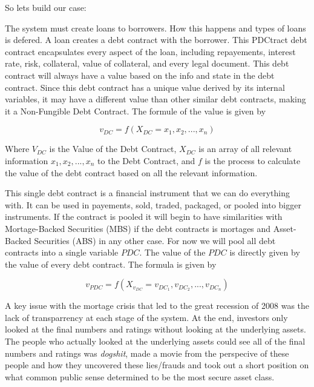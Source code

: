 So lets build our case:

The system must create loans to borrowers. How this happens and types of loans is defered. A loan creates a debt contract with the borrower. This PDCtract debt contract encapsulates every aspect of the loan, including repayements, interest rate, risk, collateral, value of collateral, and every legal document. This debt contract will always have a value based on the info and state in the debt contract. Since this debt contract has a unique value derived by its internal variables, it may have a different value than other similar debt contracts, making it a Non-Fungible Debt Contract. The formule of the value is given by

\begin{equation}
    v_{DC} = f(X_{DC} = x_{1}, x_{2}, ..., x_{n})
\end{equation}

Where $V_{DC}$ is the Value of the Debt Contract, $X_{DC}$ is an array of all relevant information $x_{1}, x_{2}, ..., x_{n}$ to the Debt Contract, and $f$ is the process to calculate the value of the debt contract based on all the relevant information. 

This single debt contract is a financial instrument that we can do everything with. It can be used in payements, sold, traded, packaged, or pooled into bigger instruments. If the contract is pooled it will begin to have similarities with Mortage-Backed Securities (MBS) if the debt contracts is mortages and Asset-Backed Securities (ABS) in any other case. For now we will pool all debt contracts into a single variable $PDC$. The value of the $PDC$ is directly given by the value of every debt contract. The formula is given by 

\begin{equation}
    v_{PDC} = f(X_{v_{DC}} = v_{DC_{1}}, v_{DC_{2}}, ..., v_{DC_{n}} )
\end{equation}

A key issue with the mortage crisis that led to the great recession of 2008 was the lack of transparrency at each stage of the system. At the end, investors only looked at the final numbers and ratings without looking at the underlying assets. The people who actually looked at the underlying assets could see all of the final numbers and ratings was \textit{dogshit}, \textcite{thebigshort} made a movie from the perspecive of these people and how they uncovered these lies/frauds and took out a short position on what common public sense determined to be the most secure asset class.

